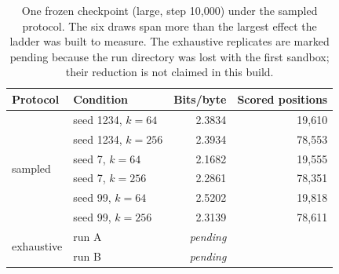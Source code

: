 \begin{table}[htbp]
\centering
\caption{One frozen checkpoint (large, step 10{,}000) under the sampled protocol.
The six draws span more than the largest effect the ladder was built to measure.
The exhaustive replicates are marked pending because the run directory was lost
with the first sandbox; their reduction is not claimed in this build.}
\label{tab:protocol}
\begin{tabular}{llrr}
\toprule
Protocol & Condition & Bits/byte & Scored positions \\
\midrule
\multirow{6}{*}{sampled} & seed 1234, $k=64$ & 2.3834 & 19{,}610 \\
 & seed 1234, $k=256$ & 2.3934 & 78{,}553 \\
 & seed 7, $k=64$ & 2.1682 & 19{,}555 \\
 & seed 7, $k=256$ & 2.2861 & 78{,}351 \\
 & seed 99, $k=64$ & 2.5202 & 19{,}818 \\
 & seed 99, $k=256$ & 2.3139 & 78{,}611 \\
\midrule
\multirow{2}{*}{exhaustive} & run A & \emph{pending} & \\
 & run B & \emph{pending} & \\
\bottomrule
\end{tabular}
\end{table}
